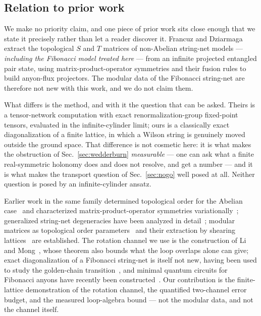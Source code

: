 \documentclass[aps,pra,twocolumn,superscriptaddress,longbibliography,floatfix,nofootinbib]{revtex4-2}
\begin{document}
\subsection{Relation to prior work}
\label{sec:priorart}

We make no priority claim, and one piece of prior work sits close enough that
we state it precisely rather than let a reader discover it. Francuz and
Dziarmaga~\cite{FrancuzDziarmaga2020} extract the topological $S$ and $T$
matrices of non-Abelian string-net models --- \emph{including the Fibonacci
model treated here} --- from an infinite projected entangled pair state, using
matrix-product-operator symmetries and their fusion rules to build anyon-flux
projectors. The modular data of the Fibonacci string-net are therefore not new
with this work, and we do not claim them.

What differs is the method, and with it the question that can be asked. Theirs
is a tensor-network computation with exact renormalization-group fixed-point
tensors, evaluated in the infinite-cylinder limit; ours is a classically exact
diagonalization of a finite lattice, in which a Wilson string is genuinely
moved outside the ground space. That difference is not
cosmetic here: it is what makes the obstruction of Sec.~\ref{sec:wedderburn}
\emph{measurable} --- one can ask what a finite real-symmetric holonomy does and
does not resolve, and get a number --- and it is what makes the transport
question of Sec.~\ref{sec:nogo} well posed at all. Neither question is posed by
an infinite-cylinder ansatz.

Earlier work in the same family determined topological order for the Abelian
case~\cite{Francuz2020} and characterized matrix-product-operator symmetries
variationally~\cite{Francuz2021}; generalized string-net degeneracies have been
analyzed in detail~\cite{RitzZwilling2024}; modular matrices as topological
order parameters~\cite{HeMoradiWen2014} and their extraction by shearing
lattices~\cite{YouCheng2015} are established. The rotation channel we use is the
construction of Li and Mong~\cite{LiMong2022}, whose theorem also bounds what
the loop overlaps alone can give; exact diagonalization of a Fibonacci
string-net is itself not new, having been used to study the golden-chain
transition~\cite{Schulz2013}, and minimal quantum circuits for Fibonacci anyons
have recently been constructed~\cite{Bseiso2024}. Our contribution is the
finite-lattice demonstration of the rotation channel, the quantified
two-channel error budget, and the measured loop-algebra bound --- not the
modular data, and not the channel itself.
\end{document}
